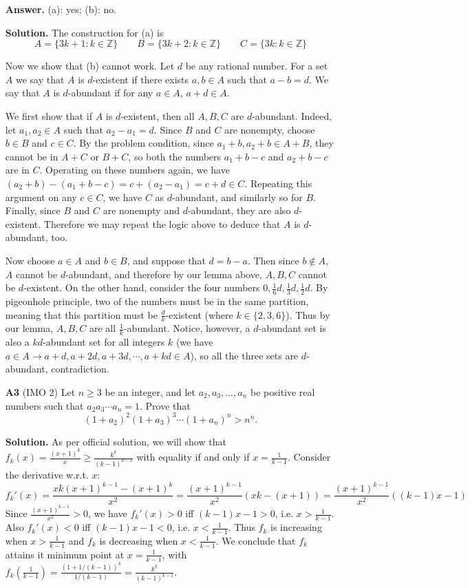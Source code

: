 \documentclass[11pt,a4paper]{article}
\begin{document}
\begin{enumerate}
    \textbf{Answer.} 
    (a): yes; (b): no. 
    
    \textbf{Solution.}
    The construction for (a) is 
    \[
    A=\{3k+1:k\in\mathbb{Z}\}
    \qquad 
    B=\{3k+2:k\in\mathbb{Z}\}
    \qquad 
    C=\{3k:k\in\mathbb{Z}\}
    \]
    
    Now we show that (b) cannot work.
    Let $d$ be any rational number.  
    For a set $A$ we say that $A$ is $d$-existent if there exists $a, b\in A$ such that $a - b = d$. 
    We say that $A$ is $d$-abundant if for any $a\in A$, $a + d\in A$. 
    
    We first show that if $A$ is $d$-existent, then all $A, B, C$ are $d$-abundant. 
    Indeed, let $a_1, a_2\in A$ such that $a_2-a_1=d$. 
    Since $B$ and $C$ are nonempty, choose $b\in B$ and $c\in C$. 
    By the problem condition, since $a_1+b, a_2+b\in A+B$, 
    they cannot be in $A+C$ or $B+C$, 
    so both the numbers $a_1+b-c$ and $a_2+b-c$ are in $C$. 
    Operating on these numbers again, 
    we have $(a_2+b) - (a_1+b-c) = c + (a_2-a_1) = c+d\in C$. 
    Repeating this argument on any $c\in C$, we have $C$ as $d$-abundant, 
    and similarly so for $B$. 
    Finally, since $B$ and $C$ are nonempty and $d$-abundant, 
    they are also $d$-existent. 
    Therefore we may repeat the logic above to deduce that $A$ is $d$-abundant, too. 
    
    Now choose $a\in A$ and $b\in B$, and suppose that $d=b-a$. 
    Then since $b\not\in A$, $A$ cannot be $d$-abundant, 
    and therefore by our lemma above, $A, B, C$ cannot be $d$-existent. 
    On the other hand, consider the four numbers $0, \frac 16d, \frac 13d, \frac 12d$. 
    By pigeonhole principle, two of the numbers must be in the same partition, meaning that this partition must be $\frac {d}{k}$-existent (where $k\in \{2, 3, 6\}$). 
    Thus by our lemma, $A, B, C$ are all $\frac 1k$-abundant. 
    Notice, however, a $d$-abundant set is also a $kd$-abundant set for all integers $k$ 
    (we have $a\in A\to a+d, a+2d, a+3d, \cdots, a+kd\in A$), 
    so all the three sets are $d$-abundant, contradiction. 
	
	\item[\textbf{A3}] (IMO 2) Let $n\ge 3$ be an integer, and let $a_2,a_3,\ldots ,a_n$ be positive real numbers such that $a_{2}a_{3}\cdots a_{n}=1$. Prove that
	\[(1 + a_2)^2 (1 + a_3)^3 \dotsm (1 + a_n)^n > n^n.\]
	
	\textbf{Solution.} As per official solution, we will show that $f_k(x)=\frac{(x+1)^k}{x}\ge \frac{k^k}{(k-1)^{k-1}}$ with equality if and only if $x=\frac{1}{k-1}$. 
	Consider the derivative w.r.t. $x$: \[f_k'(x)=\frac{xk(x+1)^{k-1}-(x+1)^k}{x^2}=\frac{(x+1)^{k-1}}{x^2}(xk-(x+1))=\frac{(x+1)^{k-1}}{x^2}((k-1)x-1)\] 
	Since $\frac{(x+1)^{k-1}}{x^2}>0$, we have $f_k'(x)>0$ iff $(k-1)x-1>0$, i.e. $x>\frac{1}{k-1}$. Also $f_k'(x)<0$ iff $(k-1)x-1<0$, i.e. $x<\frac{1}{k-1}$. Thus $f_k$ is increasing when $x>\frac{1}{k-1}$ and $f_k$ is decreasing when $x<\frac{1}{k-1}$. We conclude that $f_k$ attains it minimum point at $x=\frac{1}{k-1}$, with $f_k(\frac{1}{k-1})=\frac{(1+1/(k-1))^k}{1/(k-1)}=\frac{k^k}{(k-1)^{k-1}}$. 
	

\end{enumerate}
\end{document}
